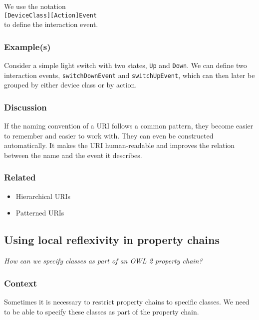 We use the notation\\ 

\noindent
\texttt{[DeviceClass][Action]Event}\\

 to define the interaction event. 

\subsubsection{Example(s)}

Consider a simple light switch with two states, \texttt{Up} and \texttt{Down}. We can define two interaction events, \texttt{switchDownEvent} and \texttt{switchUpEvent}, which can then later be grouped by either device class or by action.

\subsubsection{Discussion}

If the naming convention of a \ac{URI} follows a common pattern, they become easier to remember and easier to work with. They can even be constructed automatically. It makes the \ac{URI} human-readable and improves the relation between the name and the event it describes. 

\subsubsection{Related}

\begin{itemize}
	\item Hierarchical URIs \cite{Dodds2011}
	\item Patterned URIs \cite{Dodds2011}
\end{itemize}




\subsection{Using local reflexivity in property chains}

\emph{How can we specify classes as part of an \ac{OWL} 2 property chain?}

\subsubsection{Context}

Sometimes it is necessary to restrict property chains to specific classes. We need to be able to specify these classes as part of the property chain.

